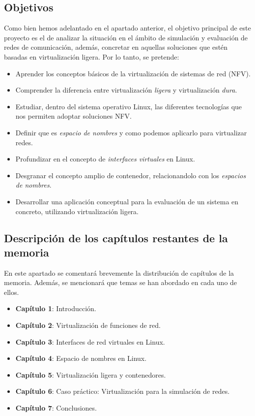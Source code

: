 \documentclass[12pt]{article}
\begin{document}
	
	\pagebreak
	
	\subsection{Objetivos}
	\noindent Como bien hemos adelantado en el apartado anterior, el objetivo principal de este proyecto es el de analizar la situación en el ámbito de simulación y evaluación de redes de comunicación, además, concretar en aquellas soluciones que estén basadas en virtualización ligera. Por lo tanto, se pretende: 
	\begin{itemize}
		\item Aprender los conceptos básicos de la virtualización de sistemas de red (NFV).
		\item Comprender la diferencia entre virtualización \textit{ligera} y virtualización \textit{dura}.
		\item Estudiar, dentro del sistema operativo Linux, las diferentes tecnologías que nos permiten adoptar soluciones NFV.
		\item Definir que es \textit{espacio de nombres} y como podemos aplicarlo para virtualizar redes.
		\item Profundizar en el concepto de \textit{interfaces virtuales} en Linux.
		\item Desgranar el concepto amplio de contenedor, relacionandolo con los \textit{espacios de nombres}.
		\item Desarrollar una aplicación conceptual para la evaluación de un sistema en concreto, utilizando virtualización ligera.
	\end{itemize}

	\subsection{Descripción de los capítulos restantes de la memoria}
	\noindent En este apartado se comentará brevemente la distribución de capítulos de la memoria. Además, se mencionará que temas se han abordado en cada uno de ellos.
	\begin{itemize}
		\item \textbf{Capítulo 1}: Introducción.
		\item \textbf{Capítulo 2}: Virtualización de funciones de red.
		\item \textbf{Capítulo 3}: Interfaces de red virtuales en Linux.
		\item \textbf{Capítulo 4}: Espacio de nombres en Linux.
		\item \textbf{Capítulo 5}: Virtualización ligera y contenedores.
		\item \textbf{Capítulo 6}: Caso práctico: Virtualización para la simulación de redes.
		\item \textbf{Capítulo 7}: Conclusiones.
	\end{itemize}
	
\end{document}
